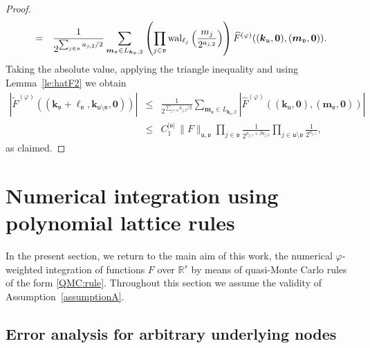 \documentclass[namedate,webpdf,imanum]{ima-authoring-arxiv}%
\theoremstyle{thmstyletwo}%
\numberwithin{equation}{section}
\newcommand{\wal}{{\rm wal}}
\newcommand{\bsk}{\boldsymbol{k}}
\newcommand{\bsm}{\boldsymbol{m}}
\newcommand{\bsell}{\boldsymbol{\ell}}
\newcommand{\bszero}{\boldsymbol{0}}
\newcommand{\uu}{\mathfrak{u}}
\newcommand{\vv}{\mathfrak{v}}
\begin{document}
\begin{proof}
\begin{eqnarray*}
& = & \frac{1}{2^{\sum_{j \in \vv} a_{j,2}/2}}  \sum_{\bsm_{\vv} \in L_{\bsk_{\vv}, 2}} \left(\prod_{j \in \vv}\wal_{\ell_j}\left(\frac{m_j}{2^{a_{j,2}}}\right)\right) \widehat{F}^{(\varphi)}((\bsk_\uu,\bszero),(\bsm_\vv,\bszero)).     
\end{eqnarray*}
Taking the absolute value, applying the triangle inequality and using Lemma~\ref{le:hatF2} we obtain 
\begin{eqnarray*}
|\widetilde{F}^{(\varphi)}((\bsk_\vv+\bsell_\vv,\bsk_{\uu \setminus \vv},\bszero))| & \le & \frac{1}{2^{\sum_{j \in \vv} a_{j,2}/2}}  \sum_{\bsm_{\vv} \in L_{\bsk_{\vv}, 2}} |\widehat{F}^{(\varphi)}((\bsk_\uu,\bszero),(\bsm_\vv,\bszero))|\\
& \le  & C_1^{|\uu|}\, \|F\|_{\uu, \vv} \prod_{j \in \vv} \frac{1}{2^{a_{j,1}+ \beta a_{j,2}}} \prod_{j \in \uu \setminus \vv} \frac{1}{2^{a_{j,1}}},  
\end{eqnarray*}
as claimed.
\end{proof}





\section{Numerical integration using polynomial lattice rules}\label{sec:intPLPS}

In the present section, we return to the main aim of this work, the numerical $\varphi$-weighted integration of functions $F$ over $\mathbb{R}^s$ by means of quasi-Monte Carlo rules of the form \eqref{QMC:rule}. Throughout this section we assume the validity of Assumption~\ref{assumptionA}.

\subsection{Error analysis for arbitrary underlying nodes}
\end{document}
